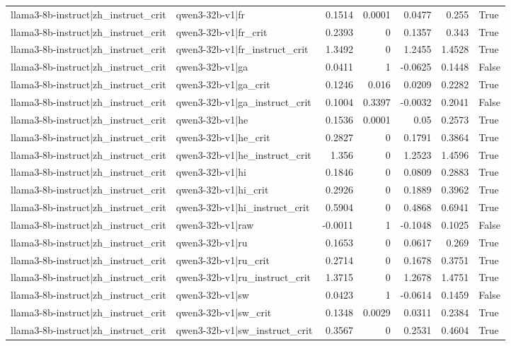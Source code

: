 \begin{table}
\begin{tabular}{l l r r r r l}
llama3-8b-instruct|zh_instruct_crit & qwen3-32b-v1|fr & 0.1514 & 0.0001 & 0.0477 & 0.255 & True \\
llama3-8b-instruct|zh_instruct_crit & qwen3-32b-v1|fr_crit & 0.2393 & 0 & 0.1357 & 0.343 & True \\
llama3-8b-instruct|zh_instruct_crit & qwen3-32b-v1|fr_instruct_crit & 1.3492 & 0 & 1.2455 & 1.4528 & True \\
llama3-8b-instruct|zh_instruct_crit & qwen3-32b-v1|ga & 0.0411 & 1 & -0.0625 & 0.1448 & False \\
llama3-8b-instruct|zh_instruct_crit & qwen3-32b-v1|ga_crit & 0.1246 & 0.016 & 0.0209 & 0.2282 & True \\
llama3-8b-instruct|zh_instruct_crit & qwen3-32b-v1|ga_instruct_crit & 0.1004 & 0.3397 & -0.0032 & 0.2041 & False \\
llama3-8b-instruct|zh_instruct_crit & qwen3-32b-v1|he & 0.1536 & 0.0001 & 0.05 & 0.2573 & True \\
llama3-8b-instruct|zh_instruct_crit & qwen3-32b-v1|he_crit & 0.2827 & 0 & 0.1791 & 0.3864 & True \\
llama3-8b-instruct|zh_instruct_crit & qwen3-32b-v1|he_instruct_crit & 1.356 & 0 & 1.2523 & 1.4596 & True \\
llama3-8b-instruct|zh_instruct_crit & qwen3-32b-v1|hi & 0.1846 & 0 & 0.0809 & 0.2883 & True \\
llama3-8b-instruct|zh_instruct_crit & qwen3-32b-v1|hi_crit & 0.2926 & 0 & 0.1889 & 0.3962 & True \\
llama3-8b-instruct|zh_instruct_crit & qwen3-32b-v1|hi_instruct_crit & 0.5904 & 0 & 0.4868 & 0.6941 & True \\
llama3-8b-instruct|zh_instruct_crit & qwen3-32b-v1|raw & -0.0011 & 1 & -0.1048 & 0.1025 & False \\
llama3-8b-instruct|zh_instruct_crit & qwen3-32b-v1|ru & 0.1653 & 0 & 0.0617 & 0.269 & True \\
llama3-8b-instruct|zh_instruct_crit & qwen3-32b-v1|ru_crit & 0.2714 & 0 & 0.1678 & 0.3751 & True \\
llama3-8b-instruct|zh_instruct_crit & qwen3-32b-v1|ru_instruct_crit & 1.3715 & 0 & 1.2678 & 1.4751 & True \\
llama3-8b-instruct|zh_instruct_crit & qwen3-32b-v1|sw & 0.0423 & 1 & -0.0614 & 0.1459 & False \\
llama3-8b-instruct|zh_instruct_crit & qwen3-32b-v1|sw_crit & 0.1348 & 0.0029 & 0.0311 & 0.2384 & True \\
llama3-8b-instruct|zh_instruct_crit & qwen3-32b-v1|sw_instruct_crit & 0.3567 & 0 & 0.2531 & 0.4604 & True \\

\end{tabular}
\end{table}
